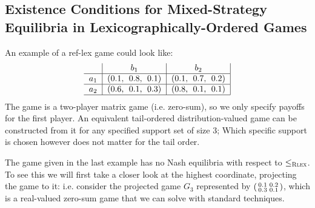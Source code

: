 \documentclass[a4paper]{scrreprt}
\begin{document}
    \subsection{Existence Conditions for Mixed-Strategy Equilibria in Lexicographically-Ordered Games}
    \begin{ex}
        \label{ex:reflectedLexicographicallyOrderedGame}
        An example of a ref-lex game could look like:
        \begin{gather}
            \centering
            \begin{tabular}{c|c|c|}
            	      &        $b_1$        &        $b_2$        \\ \hline
            	$a_1$ & (0.1,\; 0.8,\; 0.1) & (0.1,\; 0.7,\; 0.2) \\ \hline
            	$a_2$ & (0.6,\; 0.1,\; 0.3) & (0.8,\; 0.1,\; 0.1) \\ \hline
            \end{tabular}
        \end{gather}
        The game is a two-player matrix game (i.e. zero-sum), so we only specify payoffs for the first player.
        An equivalent tail-ordered distribution-valued game can be constructed from it for any specified support set of size 3;
        Which specific support is chosen however does not matter for the tail order.
    \end{ex}

    \newcommand{\Gproj}[1]{G_{#1}}
    \newcommand{\Gprojsub}[1]{\bar{G}_{#1}}
    
    The game given in the last example has no Nash equilibria with respect to $\leq_{\textsc{Rlex}}$.
    To see this we will first take a closer look at the highest coordinate, projecting the game to it: i.e. consider the projected game
    $\Gproj{3}$ represented by $\left(\begin{smallmatrix}0.1 & 0.2 \\ 0.3 & 0.1\end{smallmatrix}\right)$, which is a real-valued zero-sum game that we can solve with standard techniques.
    
\end{document}
